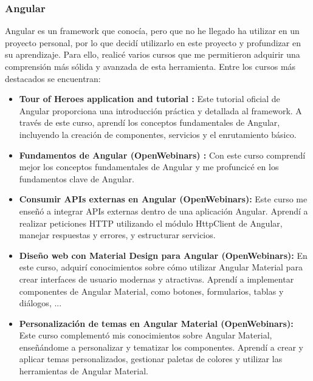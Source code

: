 \subsubsection{Angular}
Angular es un framework que conocía, pero que no he llegado ha utilizar en un proyecto personal, por lo que decidí utilizarlo en este proyecto y profundizar en su aprendizaje. Para ello, realicé varios cursos que me permitieron adquirir una comprensión más sólida y avanzada de esta herramienta. Entre los cursos más destacados se encuentran:
\begin{itemize}
\tightlist
    \item
         \textbf{Tour of Heroes application and tutorial \cite{tutorial-angular}:} Este tutorial oficial de Angular proporciona una introducción práctica y detallada al framework. A través de este curso, aprendí los conceptos fundamentales de Angular, incluyendo la creación de componentes, servicios y el enrutamiento básico.
    \item 
        \textbf{Fundamentos de Angular (OpenWebinars) \cite{openwebinars}:} Con este curso comprendí mejor los conceptos fundamentales de Angular y me profuncicé en los fundamentos clave de Angular.
    \item 
        \textbf{Consumir APIs externas en Angular (OpenWebinars):} Este curso me enseñó a integrar APIs externas dentro de una aplicación Angular. Aprendí a realizar peticiones HTTP utilizando el módulo HttpClient de Angular, manejar respuestas y errores, y estructurar servicios.
    \item 
        \textbf{Diseño web con Material Design para Angular (OpenWebinars):} En este curso, adquirí conocimientos sobre cómo utilizar Angular Material para crear interfaces de usuario modernas y atractivas. Aprendí a implementar componentes de Angular Material, como botones, formularios, tablas y diálogos, ...
    \item 
        \textbf{Personalización de temas en Angular Material (OpenWebinars):} Este curso complementó mis conocimientos sobre Angular Material, enseñándome a personalizar y tematizar los componentes. Aprendí a crear y aplicar temas personalizados, gestionar paletas de colores y utilizar las herramientas de Angular Material.
\end{itemize}

